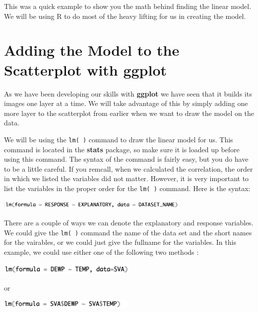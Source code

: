 \documentclass[
  letterpaper,
  DIV=11,
  numbers=noendperiod]{scrreprt}
\begin{document}
This was a quick example to show you the math behind finding the linear
model. We will be using R to do most of the heavy lifting for us in
creating the model.

\section*{Adding the Model to the Scatterplot with
ggplot}\label{adding-the-model-to-the-scatterplot-with-ggplot}


As we have been developing our skills with \textbf{ggplot} we have seen
that it builds its images one layer at a time. We will take advantage of
this by simply adding one more layer to the scatterplot from earlier
when we want to draw the model on the data.

We will be using the \texttt{lm(\ )} command to draw the linear model
for us. This command is located in the \textbf{stats} package, so make
sure it is loaded up before using this command. The syntax of the
command is fairly easy, but you do have to be a little careful. If you
remcall, when we calculated the correlation, the order in which we
listed the variables did not matter. However, it is very important to
list the variables in the proper order for the \texttt{lm(\ )} command.
Here is the syntax:

\includegraphics[width=0.7\textwidth,height=\textheight]{./images/LMR_8.jpg}

There are a couple of ways we can denote the explanatory and response
variables. We could give the \texttt{lm(\ )} command the name of the
data set and the short names for the vairables, or we could just give
the fullname for the variables. In this example, we could use either one
of the following two methods :

\includegraphics[width=0.5\textwidth,height=\textheight]{./images/LMR_9.jpg}

or

\includegraphics[width=0.5\textwidth,height=\textheight]{./images/LMR_10.jpg}
\end{document}
